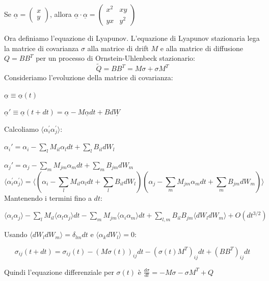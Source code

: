 \noindent Se $\underline{\alpha} = \begin{pmatrix} x \\ y \end{pmatrix}$, allora $\underline{\alpha} \cdot\underline{\alpha} = \begin{pmatrix} x^2 & xy \\ yx & y^2 \end{pmatrix}$

\noindent Ora definiamo l'equazione di Lyapunov. L'equazione di Lyapunov stazionaria lega la matrice di covarianza $\sigma$ alla matrice di drift $M$ e alla matrice di diffusione $Q=BB^T$ per un processo di Ornstein-Uhlenbeck stazionario:
\begin{equation}
\tilde{Q} = BB^T = M\sigma + \sigma M^T
\end{equation}
Consideriamo l'evoluzione della matrice di covarianza:

$\underline{\alpha} \equiv \underline{\alpha}(t)$

$\underline{\alpha}' \equiv \underline{\alpha}(t+dt) = \underline{\alpha}-M\underline{\alpha}dt+Bd\underline{W}$

\noindent Calcoliamo $\langle\alpha_{i}^{\prime}\alpha_{j}^{\prime}\rangle$:

$\alpha_i' = \alpha_i - \sum_l M_{il}\alpha_l dt + \sum_l B_{il}dW_l$

$\alpha_j' = \alpha_j - \sum_m M_{jm}\alpha_m dt + \sum_m B_{jm}dW_m$
\begin{equation*}
\langle\alpha_{i}^{\prime}\alpha_{j}^{\prime}\rangle = \langle (\alpha_i - \sum_l M_{il}\alpha_l dt + \sum_l B_{il}dW_l) (\alpha_j - \sum_m M_{jm}\alpha_m dt + \sum_m B_{jm}dW_m) \rangle
\end{equation*}
Mantenendo i termini fino a $dt$:

$\langle \alpha_i \alpha_j \rangle - \sum_l M_{il} \langle \alpha_l \alpha_j \rangle dt - \sum_m M_{jm} \langle \alpha_i \alpha_m \rangle dt + \sum_{l,m} B_{il} B_{jm} \langle dW_l dW_m \rangle + O(dt^{3/2})$

Usando $\langle dW_l dW_m \rangle = \delta_{lm} dt$ e $\langle \alpha_k dW_l \rangle = 0$:

\begin{equation}
\sigma_{ij}(t+dt) = \sigma_{ij}(t) - (M\sigma(t))_{ij}dt - (\sigma(t)M^T)_{ij}dt + (BB^T)_{ij}dt
\end{equation}

Quindi l'equazione differenziale per $\sigma(t)$ è $\frac{d\sigma}{dt} = -M\sigma - \sigma M^T + Q$

